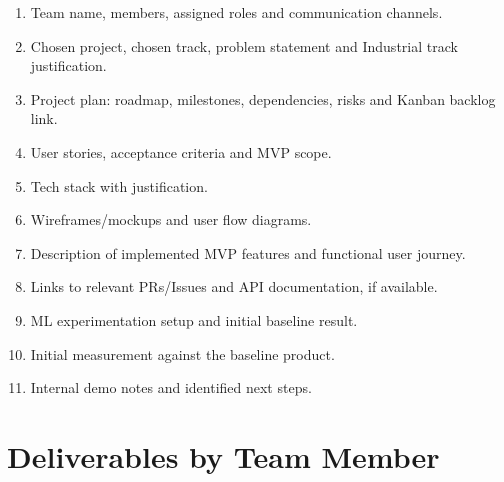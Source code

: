 \documentclass[12pt,a4paper]{article}
\begin{document}
\begin{enumerate}
    \item Team name, members, assigned roles and communication channels.
    \item Chosen project, chosen track, problem statement and Industrial track justification.
    \item Project plan: roadmap, milestones, dependencies, risks and Kanban backlog link.
    \item User stories, acceptance criteria and MVP scope.
    \item Tech stack with justification.
    \item Wireframes/mockups and user flow diagrams.
    \item Description of implemented MVP features and functional user journey.
    \item Links to relevant PRs/Issues and API documentation, if available.
    \item ML experimentation setup and initial baseline result.
    \item Initial measurement against the baseline product.
    \item Internal demo notes and identified next steps.
\end{enumerate}

\section{Deliverables by Team Member}
\end{document}
